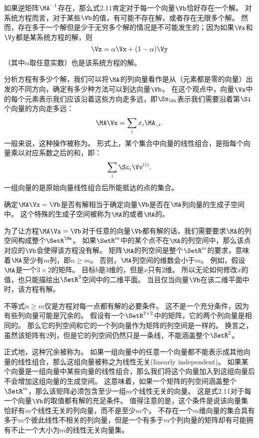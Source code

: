 如果逆矩阵$\MA^{-1}$存在，那么式2.11肯定对于每一个向量$\Vb$恰好存在一个解。
对系统方程而言，对于某些$\Vb$的值，有可能不存在解，或者存在无限多个解。
然而，存在多于一个解但是少于无穷多个解的情况是不可能发生的；因为如果$\Vx$和$\Vy$都是某系统方程的解，则
\begin{equation}
\Vz=\alpha \Vx + (1-\alpha) \Vy
\end{equation}
（其中$\alpha$取任意实数）也是该系统方程的解。


分析方程有多少个解，我们可以将$\MA$的列向量看作是从（元素都是零的向量）出发的不同方向，确定有多少种方法可以到达向量$\Vb$。
在这个观点中，向量$\Vx$中的每个元素表示我们应该沿着这些方向走多远，即$\Sx_{\Si}$表示我们需要沿着第$\Si$个向量的方向走多远：
\begin{equation}
\MA \Vx = \sum_i x_i \MA_{:,i}.
\end{equation}
一般来说，这种操作被称为。
形式上，某个集合中向量的线性组合，是指每个向量乘以对应系数之后的和，即：
\begin{equation}
    \sum_i \Sc_i \Vv^{(i)}.
\end{equation}
一组向量的是原始向量线性组合后所能抵达的点的集合。


确定$\MA\Vx=\Vb$是否有解相当于确定向量$\Vb$是否在$\MA$列向量的生成子空间中。
这个特殊的生成子空间被称为$\MA$的或者$\MA$的。


为了让方程$\MA \Vx=\Vb$对于任意的向量$\Vb$都有解的话，我们需要要求$\MA$的列空间构成整个$\SetR^{\Sm}$。
如果$\SetR^m$中的某个点不在$\MA$的列空间中，那么该点对应的$\Vb$会使得该方程没有解。
矩阵$\MA$的列空间是整个$\SetR^m$的要求，意味着$\MA$至少有$m$列，即$n\geq m$。
否则，$\MA$列空间的维数会小于$m$。
例如，假设$\MA$是一个$3\times 2$的矩阵。
目标$b$是$3$维的，但是$x$只有$2$维。
所以无论如何修改$x$的值，也只能描绘出$\SetR^3$空间中的二维平面。
当且仅当向量$\Vb$在该二维平面中时，该方程有解。





不等式$n\geq m$仅是方程对每一点都有解的必要条件。
这不是一个充分条件，因为有些列向量可能是冗余的。
假设有一个$\SetR^{2\times 2}$中的矩阵，它的两个列向量是相同的。
那么它的列空间和它的一个列向量作为矩阵的列空间是一样的。
换言之，虽然该矩阵有$2$列，但是它的列空间仍然只是一条线，不能涵盖整个$\SetR^2$。


正式地，这种冗余被称为。
如果一组向量中的任意一个向量都不能表示成其他向量的线性组合，那么这组向量被称之为线性无关(linearly independent)。
如果某个向量是一组向量中某些向量的线性组合，那么我们将这个向量加入到这组向量后不会增加这组向量的生成空间。
这意味着，如果一个矩阵的列空间涵盖整个$\SetR^m$，那么该矩阵必须包含至少一组$m$个线性无关的向量。
这是式2.11对于每一个向量$\Vb$的取值都有解的充足条件。
值得注意的是，这个条件是说该向量集恰好有$m$个线性无关的列向量，而不是至少$m$个。
不存在一个$m$维向量的集合具有多于$m$个彼此线性不相关的列向量，但是一个有多于$m$个列向量的矩阵却有可能拥有不止一个大小为$m$的线性无关向量集。


